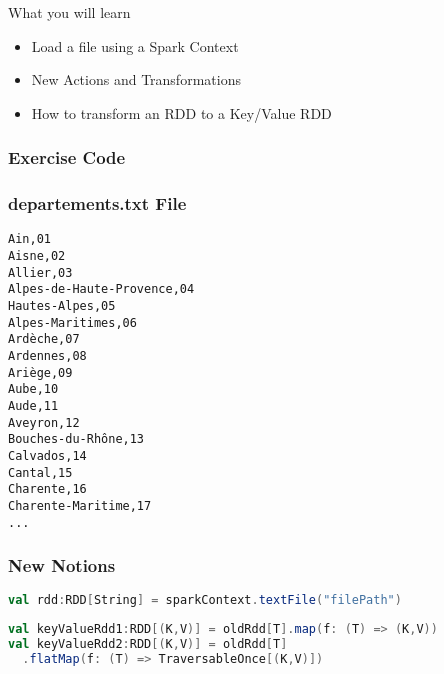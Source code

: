 \documentclass[slidetop,9pt,utf8]{beamer}
\begin{document}
\begin{CJK}{UTF8}{gbsn}
\begin{frame}
  \begin{block}{What you will learn}
    \begin{itemize}
      \item Load a file using a Spark Context
      \item New Actions and Transformations
      \item How to transform an RDD to a Key/Value RDD
    \end{itemize}
  \end{block}

\end{frame}

\begin{frame}
  \frametitle{Exercise Code}

  

\end{frame}

\begin{frame}[fragile]
  \frametitle{departements.txt File}

  \begin{verbatim}
Ain,01
Aisne,02
Allier,03
Alpes-de-Haute-Provence,04
Hautes-Alpes,05
Alpes-Maritimes,06
Ardèche,07
Ardennes,08
Ariège,09
Aube,10
Aude,11
Aveyron,12
Bouches-du-Rhône,13
Calvados,14
Cantal,15
Charente,16
Charente-Maritime,17
...
  \end{verbatim}

\end{frame}

\begin{frame}[fragile]
  \frametitle{New Notions}

  \begin{lstlisting}[label=LoadTextFile, caption=Load Text File, language=scala, style=code]
val rdd:RDD[String] = sparkContext.textFile("filePath")
  \end{lstlisting}

  \begin{lstlisting}[label=TransformToKeyValue, caption=Transform RDD to a Key/Value RDD (Also called PairRDD), language=scala, style=code]
val keyValueRdd1:RDD[(K,V)] = oldRdd[T].map(f: (T) => (K,V))
val keyValueRdd2:RDD[(K,V)] = oldRdd[T]
  .flatMap(f: (T) => TraversableOnce[(K,V)])
  \end{lstlisting}

\end{frame}


\end{CJK}
\end{document}
